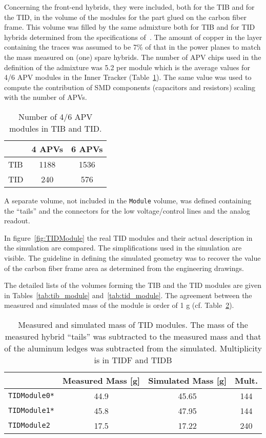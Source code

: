 \documentclass{cmspaper}
\begin{document}
Concerning the front-end hybrids, they were included, both for the TIB
and for the TID, in the volume of the modules for the part glued on
the carbon fiber frame.  
This volume was filled by the same admixture both for TIB and for TID
hybrids determined from the specifications of~\cite{hybrid}.
The amount of copper in the layer containing the traces was assumed to
be 7\% of that in the power planes to match the mass measured on (one) spare hybrids.
The number of APV chips used in the definition of the admixture was
5.2 per module which is the average values for 4/6 APV modules in the
Inner Tracker (Table~\ref{tab:apv}). The same value was used to compute the
contribution of SMD components (capacitors and resistors) scaling with the
number of APVs. 
\begin{table}[h!]
  \caption{Number of 4/6 APV modules in TIB and TID.}
  \label{tab:apv}
  \begin{center}
    \begin{tabular}{lcc}
      & 4 APVs & 6 APVs \\
      \hline
      TIB& 1188& 1536 \\
      TID&  240&  576 \\
      \hline
    \end{tabular}
  \end{center}
\end{table}
A separate volume, not included in the {\tt Module} volume, was
defined containing the ``tails'' and the connectors for the low
voltage/control lines and the analog readout.  

In figure~\ref{fig:TIDModule} the real TID modules and their actual description in
the simulation are compared. The simplifications used in the simulation
are visible. The guideline in defining the simulated geometry
was to recover the value of the carbon fiber frame area as determined from the
engineering drawings. 

The detailed lists of the volumes forming the TIB and the TID modules
are given in Tables~\ref{tab:tib_module} and~\ref{tab:tid_module}.  
The agreement between the measured and simulated mass of the module is
order of 1 g (cf. Table~\ref{tab:tibtid_module_mass}).   
\begin{table}[h!]
  \caption{Measured and simulated mass of TID modules. The mass of the
  measured hybrid ``tails'' was subtracted to the measured mass and
  that of the aluminum ledges was subtracted from the simulated.
  Multiplicity is in TIDF and TIDB}
  \label{tab:tibtid_module_mass}
  \begin{center}
    \begin{tabular}{lccc}
      & Measured Mass [g] & Simulated Mass [g] & Mult.\\
      \hline
      {\tt TIDModule0*} & 44.9 & 45.65 & 144 \\
      {\tt TIDModule1*} & 45.8 & 47.95 & 144 \\
      {\tt TIDModule2}  & 17.5 & 17.22 & 240 \\
      \hline
    \end{tabular}
  \end{center}
\end{table}
\end{document}
